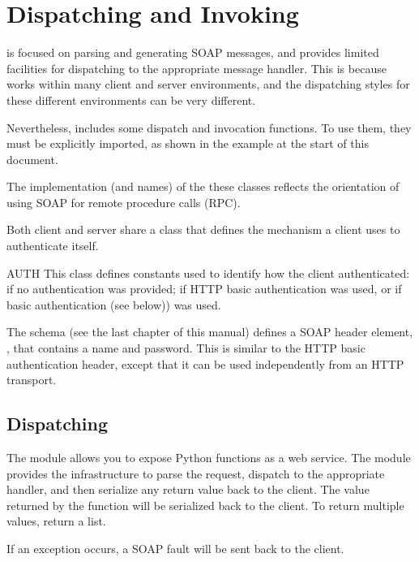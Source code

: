 \chapter{Dispatching and Invoking}


\ZSI{} is focused on parsing and generating SOAP messages, and provides
limited facilities for dispatching to the appropriate message handler.
This is because \ZSI{} works within many client and server environments,
and the dispatching styles for these different environments can be
very different.

Nevertheless, \ZSI{} includes some dispatch and invocation functions.
To use them, they must be explicitly imported, as shown in the example
at the start of this document.

The implementation (and names) of the these classes reflects the orientation
of using SOAP for remote procedure calls (RPC).

Both client and server share a class that defines the mechanism a
client uses to authenticate itself.

\begin{classdesc}{AUTH}{}
This class defines constants used to identify how the client
authenticated:  if no authentication was provided;
 if HTTP basic authentication was used, or
 if \ZSI{} basic authentication (see below)) was used.
\end{classdesc}

The \ZSI{} schema (see the last chapter of this manual)
defines a SOAP header element, , that
contains a name and password.
This is similar to the HTTP basic authentication header, except
that it can be used independently from an HTTP transport.

\section{Dispatching}

The  module allows you to expose Python functions as a
web service.
The module provides the infrastructure to parse the request, dispatch
to the appropriate handler, and then serialize any return value
back to the client.
The value returned by the function will be serialized back to the client.
To return multiple values, return a list.

If an exception occurs, a SOAP fault will be sent back to the client.

